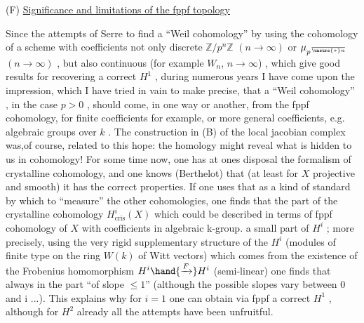 
 (F) \uline{Significance and limitations of the fppf topology}

Since the attempts of Serre to find a ``Weil cohomology'' by using the
cohomology of a scheme with coefficients not only discrete $\mathbb{Z}/p^n\mathbb{Z}$ $(n \to \infty)$
 or $\mu_{p^{\over{\unsure{\ast}}{n}}}$ $(n \to \infty)$ , but also continuous (for example $W_n$, $n \to \infty$) , which
give good results for recovering a correct $H^1$ , during numerous years I
have come upon the impression, which I have tried in vain to make precise,
that a  ``Weil cohomology''\hand{,} , in the case $p > 0$ , should come, in
one way or another, from the fppf cohomology, for finite coefficients
for example, or more general coefficients, e.g. algebraic groups over $k$ .
The construction in (B) of the local jacobian complex was,of course, related
to this hope: the homology might reveal what is hidden to us in cohomology!
For some time now, one has at ones disposal the formalism of crystalline
cohomology, and one knows (Berthelot) that (at least for $X$ projective
and smooth) it has the correct properties. If one uses that as a kind of
standard by which to ``measure'' the other cohomologies, one finds that
the part of the crystalline cohomology $H^i_{\text{cris}}(X)$ which could be described in
terms of fppf cohomology of $X$ with coefficients in  algebraic k-group.
  a small part of $H^i$  ; more precisely, using the very rigid
supplementary structure of the $H^i$ (modules of finite type on the ring $W(k)$
of Witt vectors) which comes from the existence of the Frobenius homomorphism 
$H^i \hand{\xrightarrow{F}} H^i$ (semi-linear)\hand{,} one finds that   always in the part ``of slope
$\leq 1$'' (although the possible slopes vary between 0 and i ...). This explains
why for $i = 1$ one can obtain via fppf a correct $H^1$ , although for $H^2$
already all the attempts have been unfruitful.

